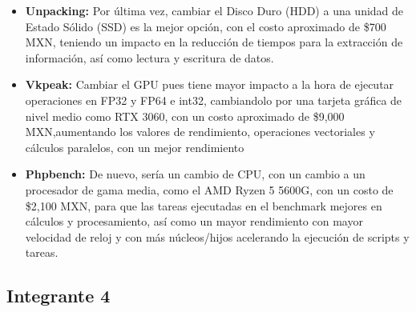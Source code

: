 \documentclass[12pt]{article}
\begin{document}
\begin{enumerate}[label=(\arabic{section}.\arabic{subsection}.\arabic{enumi})]
\begin{itemize}
    	\item \textbf{Unpacking:} Por última vez, cambiar el Disco Duro (HDD) a una unidad de Estado Sólido (SSD) es la mejor opción, con el costo aproximado de \$700 MXN, teniendo un impacto en la reducción de tiempos para la extracción de información, así como lectura y escritura de datos.
    	
    	\item \textbf{Vkpeak:} Cambiar el GPU pues tiene mayor impacto a la hora de ejecutar operaciones en FP32 y FP64 e int32, cambiandolo por una tarjeta gráfica de nivel medio como RTX 3060, con un costo aproximado de \$9,000 MXN,aumentando los valores de rendimiento, operaciones vectoriales y cálculos paralelos, con un mejor rendimiento
    	
    	\item \textbf{Phpbench:} De nuevo, sería un cambio de CPU, con un cambio a un procesador de gama media, como el AMD Ryzen 5 5600G, con un costo de  \$2,100 MXN, para que las tareas ejecutadas en el benchmark mejores en cálculos y procesamiento, así como un mayor rendimiento con mayor velocidad de reloj y con más núcleos/hijos acelerando la ejecución de scripts y tareas.
    	
    \end{itemize}

\end{enumerate}

\subsection{Integrante 4}
\end{document}
